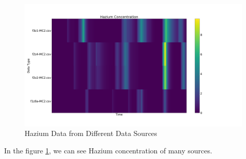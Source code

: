 \documentclass[aps, 10pt, a4paper]{article}
\begin{document}
                \begin{figure}[htbp]
                    \centering
                    \includegraphics[width=0.4 \linewidth]{figures/hazium.png}
                    \caption{Hazium Data from Different Data Sources}
                    \label{fig:generalhazium}
                \end{figure}
            
                In the figure \ref{fig:generalhazium}, we can see Hazium concentration of many sources. 
\end{document}
